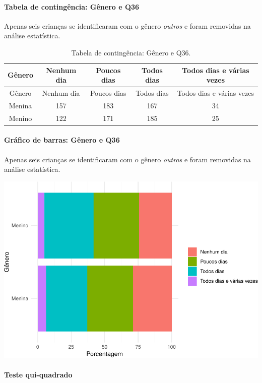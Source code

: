 \documentclass[]{article}
\let\oldparagraph\paragraph
\renewcommand{\paragraph}[1]{\oldparagraph{#1}\mbox{}}
\begin{document}
\cleardoublepage

\hypertarget{tabela-de-continguxeancia-guxeanero-e-q36}{%
\paragraph{Tabela de contingência: Gênero e Q36}\label{tabela-de-continguxeancia-guxeanero-e-q36}}

Apenas seis crianças se identificaram com o gênero \emph{outros} e foram removidas na análise estatística.

\begin{longtable}[]{@{}ccccc@{}}
\caption{\label{tab:unnamed-chunk-1321}Tabela de contingência: Gênero e Q36.}\tabularnewline
\toprule
Gênero & Nenhum dia & Poucos dias & Todos dias & Todos dias e várias vezes\tabularnewline
\midrule
\endfirsthead
\toprule
Gênero & Nenhum dia & Poucos dias & Todos dias & Todos dias e várias vezes\tabularnewline
\midrule
\endhead
Menina & 157 & 183 & 167 & 34\tabularnewline
Menino & 122 & 171 & 185 & 25\tabularnewline
\bottomrule
\end{longtable}

\hypertarget{gruxe1fico-de-barras-guxeanero-e-q36}{%
\paragraph{Gráfico de barras: Gênero e Q36}\label{gruxe1fico-de-barras-guxeanero-e-q36}}

Apenas seis crianças se identificaram com o gênero \emph{outros} e foram removidas na análise estatística.

\begin{center}\includegraphics[width=0.75\linewidth]{relatorio_covid19_files/figure-latex/unnamed-chunk-1322-1} \end{center}

\hypertarget{teste-qui-quadrado-113}{%
\paragraph{Teste qui-quadrado}\label{teste-qui-quadrado-113}}
\end{document}
